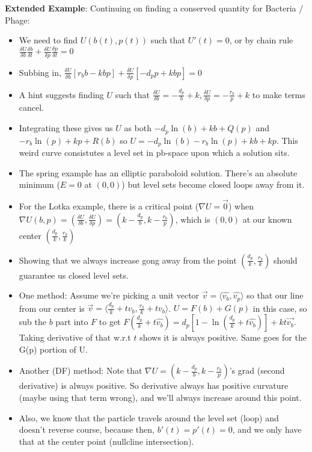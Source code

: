 \documentclass[11pt, oneside]{article}   	%
\begin{document}
\textbf{Extended Example}: Continuing on finding a conserved quantity for Bacteria / Phage:
\begin{itemize}
\item We need to find $U(b(t), p(t))$ such that $U'(t) = 0$, or by chain rule $\frac{\delta U}{\delta b}\frac{\delta b}{\delta t}  + \frac{\delta U}{\delta p}\frac{\delta p}{\delta t} = 0$
\item Subbing in, $\frac{\delta U}{\delta b}[r_bb-kbp]  + \frac{\delta U}{\delta p}[-d_pp+kbp] = 0$
\item A hint suggests finding $U$ such that $\frac{\delta U}{\delta b} = -\frac{d_p}{b} + k, \frac{\delta U}{\delta p} = -\frac{r_b}{p} + k$ to make terms cancel.
\item Integrating these gives us $U$ as both $-d_p\ln(b)+kb+Q(p)$ and $-r_b\ln(p)+kp+R(b)$ so $U = -d_p\ln(b)-r_b\ln(p)+kb+kp$.  This weird curve consistutes a level set in pb-space upon which a solution sits.
\item The spring example has an elliptic paraboloid solution.  There's an absolute minimum ($E = 0$ at $(0,0)$) but level sets become closed loops away from it.
\item For the Lotka example, there is a critical point ($\nabla U = \vec{0}$) when $\nabla U(b,p) = (\frac{\delta U}{\delta b}, \frac{\delta U}{\delta p}) = (k-\frac{d_p}{b}, k - \frac{r_b}{p})$, which is $(0, 0)$ at our known center $(\frac{d_p}{k}, \frac{r_b}{k})$
\item Showing that we always increase gong away from the point $(\frac{d_p}{k}, \frac{r_b}{k})$ should guarantee us closed level sets.
\item One method: Assume we're picking a unit vector $\vec{v} = \langle \hat{v_b}, \hat{v_p} \rangle$ so that our line from our center is $\vec{v} = \langle \frac{d_p}{k}+t{v_b}, \frac{r_b}{k}+t{v_b} \rangle$.  $U=F(b) + G(p)$ in this case, so sub the $b$ part into $F$ to get $F (\frac{d_p}{k} +t\hat{v_b}) = d_p[1-\ln(\frac{d_p}{k} + t\hat{v_b})]+kt\vec{v_b}$.  Taking derivative of that w.r.t $t$ shows it is always positive.  Same goes for the G(p) portion of U.
\item Another (DF) method: Note that $\nabla U = (k - \frac{d_p}{b}, k - \frac{r_b}{p})$'s grad (second derivative) is always positive.  So derivative always has positive curvature (maybe using that term wrong), and we'll always increase around this point.
\item Also, we know that the particle travels around the level set (loop) and doesn't reverse course, because then, $b'(t) = p'(t) = 0$, and we only have that at the center point (nullcline intersection).
\end{itemize}
\end{document}
